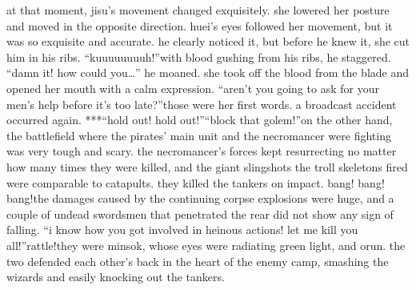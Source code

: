 at that moment, jisu’s movement changed exquisitely.
 she lowered her posture and moved in the opposite direction.
 huei’s eyes followed her movement, but it was so exquisite and accurate.
 he clearly noticed it, but before he knew it, she cut him in his ribs.
“kuuuuuuuuh!”with blood gushing from his ribs, he staggered.
“damn it! how could you…” he moaned.
she took off the blood from the blade and opened her mouth with a calm expression.
“aren’t you going to ask for your men’s help before it’s too late?”those were her first words.
 a broadcast accident occurred again.
***“hold out! hold out!”“block that golem!”on the other hand, the battlefield where the pirates’ main unit and the necromancer were fighting was very tough and scary.
 the necromancer’s forces kept resurrecting no matter how many times they were killed, and the giant slingshots the troll skeletons fired were comparable to catapults.
 they killed the tankers on impact.
bang! bang! bang!the damages caused by the continuing corpse explosions were huge, and a couple of undead swordsmen that penetrated the rear did not show any sign of falling.
“i know how you got involved in heinous actions! let me kill you all!”rattle!they were minsok, whose eyes were radiating green light, and orun.
the two defended each other’s back in the heart of the enemy camp, smashing the wizards and easily knocking out the tankers.
 

 